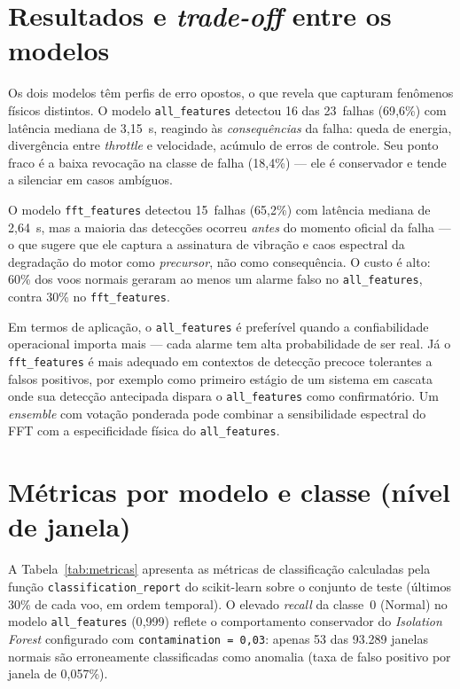\documentclass[12pt, a4paper]{article}
\begin{document}
\section{Resultados e \textit{trade-off} entre os modelos}

Os dois modelos têm perfis de erro opostos, o que revela que capturam fenômenos
físicos distintos. O modelo \texttt{all\_features} detectou 16 das 23~falhas
(69{,}6\%) com latência mediana de 3{,}15~s, reagindo às \textit{consequências}
da falha: queda de energia, divergência entre \textit{throttle} e velocidade,
acúmulo de erros de controle. Seu ponto fraco é a baixa revocação na classe de
falha (18{,}4\%) --- ele é conservador e tende a silenciar em casos ambíguos.

O modelo \texttt{fft\_features} detectou 15~falhas (65{,}2\%) com latência
mediana de 2{,}64~s, mas a maioria das detecções ocorreu \textit{antes} do
momento oficial da falha --- o que sugere que ele captura a assinatura de
vibração e caos espectral da degradação do motor como \textit{precursor}, não
como consequência. O custo é alto: 60\% dos voos normais geraram ao menos um
alarme falso no \texttt{all\_features}, contra 30\% no \texttt{fft\_features}.

Em termos de aplicação, o \texttt{all\_features} é preferível quando a
confiabilidade operacional importa mais --- cada alarme tem alta probabilidade de
ser real. Já o \texttt{fft\_features} é mais adequado em contextos de detecção
precoce tolerantes a falsos positivos, por exemplo como primeiro estágio de um
sistema em cascata onde sua detecção antecipada dispara o \texttt{all\_features}
como confirmatório. Um \textit{ensemble} com votação ponderada pode combinar a
sensibilidade espectral do FFT com a especificidade física do
\texttt{all\_features}.

\section{Métricas por modelo e classe (nível de janela)}

A Tabela~\ref{tab:metricas} apresenta as métricas de classificação calculadas
pela função \texttt{classifi\-cation\_re\-port} do scikit-learn sobre o conjunto
de teste (últimos 30\% de cada voo, em ordem temporal). O elevado
\textit{recall} da classe~0 (Normal) no modelo \texttt{all\_features} (0{,}999)
reflete o comportamento conservador do \textit{Isolation Forest} configurado com
\texttt{contamination\,=\,0{,}03}: apenas 53 das 93.289 janelas normais são
erroneamente classificadas como anomalia (taxa de falso positivo por janela de
0{,}057\%).
\end{document}

